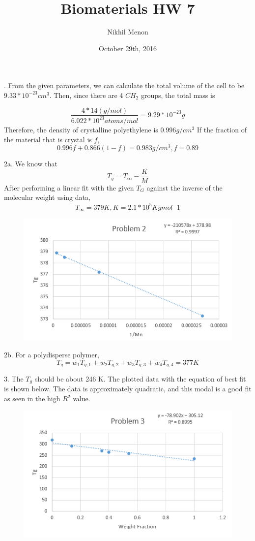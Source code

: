 \documentclass{article}
\title{Biomaterials HW 7}
\author{Nikhil Menon}
\date{October 29th, 2016}
\begin{document}
. From the given parameters, we can calculate the total volume of the cell to be $9.33*10^{-23} cm^3$. Then, since there are 4 $CH_2$ groups, the total mass is 

$$\frac{4*14 (g/mol)}{6.022*10^{23} atoms/mol}=9.29*10^{-23} g$$
Therefore, the density of crystalline polyethylene is $0.996 g/cm^3$
If the fraction of the material that is crystal is $f$,
$$0.996f+0.866(1-f)=0.983 g/cm^3, f=0.89$$

2a. We know that
$$T_g=T_{\infty}-\frac{K}{M}$$
After performing a linear fit with the given $T_G$ against the inverse of the molecular weight using data,
$$T_{\infty}=379 K, K=2.1*10^5 K g mol^-{1}$$
\begin{figure}[h]
\centering
\includegraphics[scale=0.9]{P2.png}
\end{figure}

2b. For a polydisperse polymer, 
$$T_g=w_1T_{g,1}+w_2T_{g,2}+w_3T_{g,3}+w_4T_{g,4}=377 K$$

3. The $T_g$ should be about 246 K. The plotted data with the equation of best fit is shown below. The data is approximately quadratic, and this modal is a good fit as seen in the high $R^2$ value.
\begin{figure}[h]
\centering
\includegraphics[scale=1]{P3.png}
\end{figure}
\end{document}
